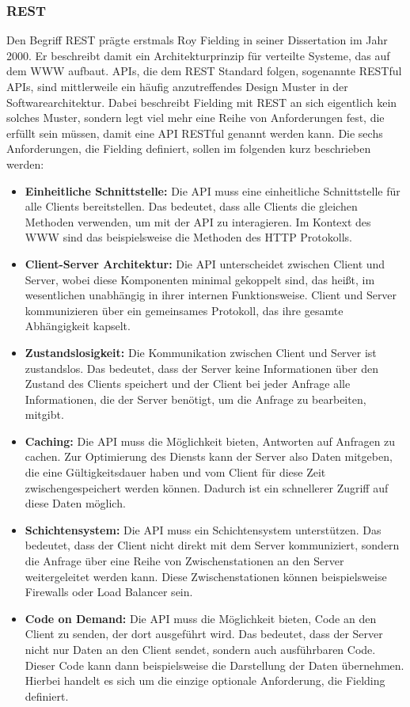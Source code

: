 \subsubsection*{REST}
Den Begriff \ac{REST} prägte erstmals Roy Fielding in seiner Dissertation im Jahr 2000. Er beschreibt damit ein Architekturprinzip für verteilte Systeme, das auf dem \ac{WWW} aufbaut. \cite[Vgl. ][S. 76]{REST2000} \ac{API}s, die dem REST Standard folgen, sogenannte \ac{REST}ful \ac{API}s, sind mittlerweile ein häufig anzutreffendes Design Muster in der Softwarearchitektur. Dabei beschreibt Fielding mit \ac{REST} an sich eigentlich kein solches Muster, sondern legt viel mehr eine Reihe von Anforderungen fest, die erfüllt sein müssen, damit eine \ac{API} \ac{REST}ful genannt werden kann. \cite[Vgl. ][S. XV]{richardson2007web} Die sechs Anforderungen, die Fielding definiert, sollen im folgenden kurz beschrieben werden:
\begin{itemize}
  \item 
  \textbf{Einheitliche Schnittstelle:} Die \ac{API} muss eine einheitliche Schnittstelle für alle Clients bereitstellen. Das bedeutet, dass alle Clients die gleichen Methoden verwenden, um mit der \ac{API} zu interagieren. Im Kontext des \ac{WWW} sind das beispielsweise die Methoden des \ac{HTTP} Protokolls.
  \item \textbf{Client-Server Architektur:} Die \ac{API} unterscheidet zwischen Client und Server, wobei diese Komponenten minimal gekoppelt sind, das heißt, im wesentlichen unabhängig in ihrer internen Funktionsweise. Client und Server kommunizieren über ein gemeinsames Protokoll, das ihre gesamte Abhängigkeit kapselt.
  \item \textbf{Zustandslosigkeit:} Die Kommunikation zwischen Client und Server ist zustandslos. Das bedeutet, dass der Server keine Informationen über den Zustand des Clients speichert und der Client bei jeder Anfrage alle Informationen, die der Server benötigt, um die Anfrage zu bearbeiten, mitgibt. 
  \item \textbf{Caching:} Die \ac{API} muss die Möglichkeit bieten, Antworten auf Anfragen zu cachen. Zur Optimierung des Diensts kann der Server also Daten mitgeben, die eine Gültigkeitsdauer haben und vom Client für diese Zeit zwischengespeichert werden können. Dadurch ist ein schnellerer Zugriff auf diese Daten möglich.
  \item \textbf{Schichtensystem:} Die \ac{API} muss ein Schichtensystem unterstützen. Das bedeutet, dass der Client nicht direkt mit dem Server kommuniziert, sondern die Anfrage über eine Reihe von Zwischenstationen an den Server weitergeleitet werden kann. Diese Zwischenstationen können beispielsweise Firewalls oder Load Balancer sein.
  \item \textbf{Code on Demand:} Die \ac{API} muss die Möglichkeit bieten, Code an den Client zu senden, der dort ausgeführt wird. Das bedeutet, dass der Server nicht nur Daten an den Client sendet, sondern auch ausführbaren Code. Dieser Code kann dann beispielsweise die Darstellung der Daten übernehmen. Hierbei handelt es sich um die einzige optionale Anforderung, die Fielding definiert. \cite[Vgl. ][]{redhat_2020_was}
\end{itemize}

